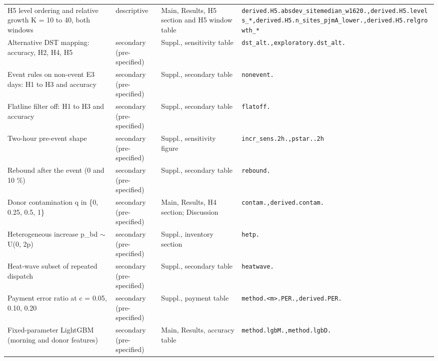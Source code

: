 {\begin{longtable}{@{}>{\raggedright\arraybackslash}p{}>{\raggedright\arraybackslash}p{}>{\raggedright\arraybackslash}p{}>{\raggedright\arraybackslash}p{}@{}}
H5 level ordering and relative growth K = 10 to 40, both windows & descriptive & Main, Results, H5 section and H5 window table & \texttt{derived.\allowbreak H5.\allowbreak absdev\_sitemedian\_w1620.\allowbreak {*},\allowbreak  derived.\allowbreak H5.\allowbreak levels\_{*},\allowbreak  derived.\allowbreak H5.\allowbreak n\_sites\_pjmA\_lower.\allowbreak {*},\allowbreak  derived.\allowbreak H5.\allowbreak relgrowth\_{*}} \\
Alternative DST mapping: accuracy, H2, H4, H5 & secondary (pre-specified) & Suppl., sensitivity table & \texttt{dst\_alt.\allowbreak {*},\allowbreak  exploratory.\allowbreak dst\_alt.\allowbreak {*}} \\
Event rules on non-event E3 days: H1 to H3 and accuracy & secondary (pre-specified) & Suppl., secondary table & \texttt{nonevent.\allowbreak {*}} \\
Flatline filter off: H1 to H3 and accuracy & secondary (pre-specified) & Suppl., secondary table & \texttt{flatoff.\allowbreak {*}} \\
Two-hour pre-event shape & secondary (pre-specified) & Suppl., sensitivity figure & \texttt{incr\_sens.\allowbreak 2h.\allowbreak {*},\allowbreak  pstar.\allowbreak {*}.\allowbreak 2h} \\
Rebound after the event (0 and 10 \%) & secondary (pre-specified) & Suppl., secondary table & \texttt{rebound.\allowbreak {*}} \\
Donor contamination q in \{0, 0.25, 0.5, 1\} & secondary (pre-specified) & Main, Results, H4 section; Discussion & \texttt{contam.\allowbreak {*},\allowbreak  derived.\allowbreak contam.\allowbreak {*}} \\
Heterogeneous increase p\_bd $\sim$ U(0, 2p) & secondary (pre-specified) & Suppl., inventory section & \texttt{hetp.\allowbreak {*}} \\
Heat-wave subset of repeated dispatch & secondary (pre-specified) & Suppl., secondary table & \texttt{heatwave.\allowbreak {*}} \\
Payment error ratio at c = 0.05, 0.10, 0.20 & secondary (pre-specified) & Suppl., payment table & \texttt{method.\allowbreak \textless{}m\textgreater{}.\allowbreak PER.\allowbreak {*},\allowbreak  derived.\allowbreak PER.\allowbreak {*}} \\
Fixed-parameter LightGBM (morning and donor features) & secondary (pre-specified) & Main, Results, accuracy table & \texttt{method.\allowbreak lgbM.\allowbreak {*},\allowbreak  method.\allowbreak lgbD.\allowbreak {*}} \\

\end{longtable}}
